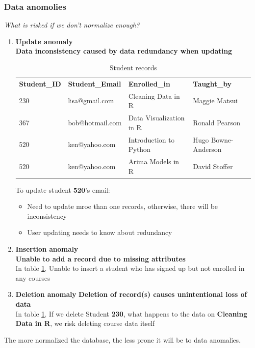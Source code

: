 \subsubsection{Data anomolies}
\emph{What is risked if we don't normalize enough?}
\begin{enumerate}
    \item \textbf{Update anomaly} \\
    \textbf{Data inconsistency caused by data redundancy when updating}
    \begin{table}[H]
        \caption{Student records}
        \label{tab:StudentRecords}
        \begin{tabular}{llll}
        \textbf{Student\_ID} & \textbf{Student\_Email} & \textbf{Enrolled\_in} & \textbf{Taught\_by} \\
        230 & lisa@gmail.com & Cleaning Data in R & Maggie Matsui \\
        367 & bob@hotmail.com & Data Visualization in R & Ronald Pearson \\
        520 & ken@yahoo.com & Introduction to Python & Hugo Bowne-Anderson \\
        520 & ken@yahoo.com & Arima Models in R & David Stoffer \\
        \end{tabular}
    \end{table}
    To update student \textbf{520}'s email:
    \begin{itemize}
        \item Need to update mroe than one records, otherwise, there will be inconsistency
        \item User updating needs to know about redundancy
    \end{itemize}
    \item \textbf{Insertion anomaly} \\
    \textbf{Unable to add a record due to missing attributes} \\
    In table \ref{tab:StudentRecords}, Unable to insert a student who has signed up but not enrolled in any courses
    \item \textbf{Deletion anomaly}
    \textbf{Deletion of record(s) causes unintentional loss of data} \\
    In table \ref{tab:StudentRecords}, If we delete Student \textbf{230}, what happens to the data on \textbf{Cleaning Data in R}, we risk deleting course data itself
\end{enumerate}

The more normalized the database, the less prone it will be to data anomalies.

